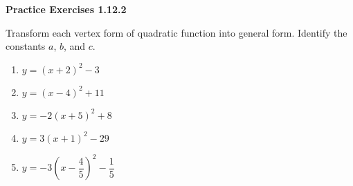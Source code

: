 \vspace{1ex}
\noindent\textbf{Practice Exercises 1.12.2}

\vspace{0.75ex}

Transform each vertex form of quadratic function into general form. Identify the 
constants $a$, $b$, and $c$.
\begin{multicols}{2}
\begin{enumerate}[label = \color{blue}\arabic*. ]
\item $ y = (x + 2)^{2} - 3 $
\item $ y = (x - 4)^{2} + 11 $
\item $ y = -2(x + 5)^{2} + 8 $
\item $ y = 3(x + 1)^{2} - 29 $
\item $ y = -3(x - \dfrac{4}{5})^{2} - \dfrac{1}{5} $
\end{enumerate}
\end{multicols} 
